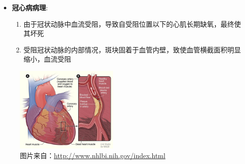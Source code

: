 \begin{frame}
\begin{itemize}
  \item \textbf{冠心病病理}: 
  \begin{enumerate}[A]
    \item 由于冠状动脉中血流受阻，导致自受阻位置以下的心肌长期缺氧，最终使其坏死
    \item 受阻冠状动脉的内部情况，斑块固着于血管内壁，致使血管横截面积明显缩小，血流受阻
  \end{enumerate}
\end{itemize}
\begin{figure}[t]
\centering
\includegraphics[height=120pt]{../../Figures/background/heart_attack_large.eps}
\caption[冠心病病理]{图片来自：\url{http://www.nhlbi.nih.gov/index.html}}
\end{figure}
\end{frame}

